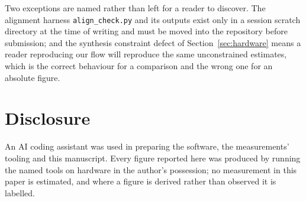 \documentclass[11pt]{article}
\theoremstyle{definition}
\begin{document}
Two exceptions are named rather than left for a reader to discover. The
alignment harness \texttt{align\_check.py} and its outputs exist only in a
session scratch directory at the time of writing and must be moved into the
repository before submission; and the synthesis constraint defect of
Section~\ref{sec:hardware} means a reader reproducing our flow will reproduce the
same unconstrained estimates, which is the correct behaviour for a comparison and
the wrong one for an absolute figure.

\section*{Disclosure}

An AI coding assistant was used in preparing the software, the measurements'
tooling and this manuscript. Every figure reported here was produced by running
the named tools on hardware in the author's possession; no measurement in this
paper is estimated, and where a figure is derived rather than observed it is
labelled.
\end{document}
